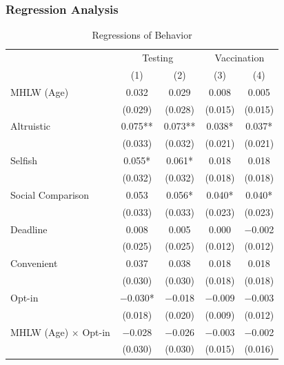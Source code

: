 \documentclass[
]{article}
\begin{document}
\hypertarget{regression-analysis-1}{%
\subsubsection{Regression Analysis}\label{regression-analysis-1}}

\begin{table}

\caption{\label{tab:reg-act}Regressions of Behavior}
\centering
\fontsize{9}{11}\selectfont
\begin{threeparttable}
\begin{tabular}[t]{lcccc}
\toprule
\multicolumn{1}{c}{ } & \multicolumn{2}{c}{Testing} & \multicolumn{2}{c}{Vaccination} \\
\cmidrule(l{3pt}r{3pt}){2-3} \cmidrule(l{3pt}r{3pt}){4-5}
  & (1) & (2) & (3) & (4)\\
\midrule
MHLW (Age) & \num{0.032} & \num{0.029} & \num{0.008} & \num{0.005}\\
 & (\num{0.029}) & (\num{0.028}) & (\num{0.015}) & (\num{0.015})\\
Altruistic & \num{0.075}** & \num{0.073}** & \num{0.038}* & \num{0.037}*\\
 & (\num{0.033}) & (\num{0.032}) & (\num{0.021}) & (\num{0.021})\\
Selfish & \num{0.055}* & \num{0.061}* & \num{0.018} & \num{0.018}\\
 & (\num{0.032}) & (\num{0.032}) & (\num{0.018}) & (\num{0.018})\\
Social Comparison & \num{0.053} & \num{0.056}* & \num{0.040}* & \num{0.040}*\\
 & (\num{0.033}) & (\num{0.033}) & (\num{0.023}) & (\num{0.023})\\
Deadline & \num{0.008} & \num{0.005} & \num{0.000} & \num{-0.002}\\
 & (\num{0.025}) & (\num{0.025}) & (\num{0.012}) & (\num{0.012})\\
Convenient & \num{0.037} & \num{0.038} & \num{0.018} & \num{0.018}\\
 & (\num{0.030}) & (\num{0.030}) & (\num{0.018}) & (\num{0.018})\\
Opt-in & \num{-0.030}* & \num{-0.018} & \num{-0.009} & \num{-0.003}\\
 & (\num{0.018}) & (\num{0.020}) & (\num{0.009}) & (\num{0.012})\\
MHLW (Age) $\times$ Opt-in & \num{-0.028} & \num{-0.026} & \num{-0.003} & \num{-0.002}\\
 & (\num{0.030}) & (\num{0.030}) & (\num{0.015}) & (\num{0.016})\\

\end{tabular}
\end{threeparttable}
\end{table}
\end{document}
